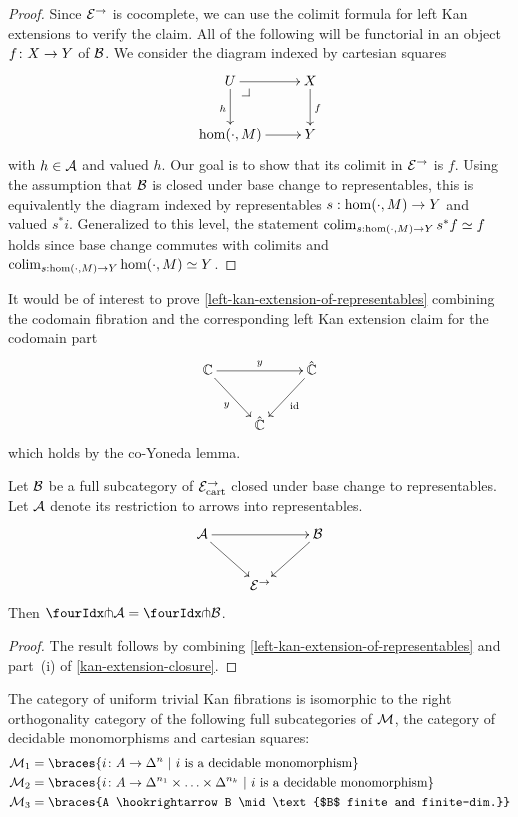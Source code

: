 \documentclass[reqno,10pt,a4paper,oneside]{amsart}
\begin{document}
\begin{proof}
Since $\catE^{\to}$ is cocomplete, we can use the colimit formula for left Kan extensions to verify the claim.
All of the following will be functorial in an object $f \co X \to Y$ of $\cal{B}$.
We consider the diagram indexed by cartesian squares
\[
\xymatrix{
  U
  \ar[r]
  \ar[d]_{h}
  \pullback{dr}
&
  X
  \ar[d]^{f}
\\
  \hom(\arghole, M)
  \ar[r]
&
  Y
}
\]
with $h \in \cal{A}$ and valued $h$.
Our goal is to show that its colimit in $\catE^{\to}$ is $f$.
Using the assumption that $\cal{B}$ is closed under base change to representables, this is equivalently the diagram indexed by representables $s : \hom(\arghole, M) \to Y$ and valued $s^* i$.
Generalized to this level, the statement $\colim_{s : \hom(\arghole, M) \to Y} s^* f \simeq f$ holds since base change commutes with colimits and 
$\colim_{s : \hom(\arghole, M) \to Y} \hom(\arghole, M) \simeq Y$.
\end{proof}


\begin{remark} It would be of interest to prove \cref{left-kan-extension-of-representables} combining 
the codomain fibration and the corresponding left Kan extension claim for the codomain part
\[
\xymatrix{
  \cat{C}
  \ar[rr]^{y}
  \ar[dr]_{y}
&&
  \hat{\catC}
  \ar[dl]^{\id}
\\&
  \hat{\cat{C}}
}
\]
which holds by the co-Yoneda lemma.
\end{remark}



\begin{lemma}
\label{awfs-on-arrows-into-representables}
Let $\cal{B}$ be a full subcategory of $\catE_{\cart}^{\to}$ closed under base change to representables.
Let $\cal{A}$ denote its restriction to arrows into representables.
\[
\xymatrix{
  \cal{A}
  \ar[rr]
  \ar[dr]
&&
  \cal{B}
  \ar[dl]
\\&
  \catE^{\to}
}
\]
Then $\liftr{\cal{A}} = \liftr{\cal{B}}$.
\end{lemma}

\begin{proof} The result follows by combining \cref{left-kan-extension-of-representables} and part~(i) of \cref{kan-extension-closure}. 
\end{proof}


\begin{theorem} \label{small-gen-triv-kan}
The category of uniform trivial Kan fibrations is isomorphic to the right orthogonality 
category of the following full subcategories of $\cal{M}$, the category of decidable
monomorphisms and cartesian squares:
\begin{align*}
\cal{M}_1 & = \braces{i \co A \rightarrow \Delta^{n} \ | \ i \text{ is a  decidable monomorphism} } \\ 
\cal{M}_2  & = \braces{i \co A \rightarrow \Delta^{n_1} \times \ldots \times \Delta^{n_k} 
\ | \ i \text{ is a  decidable monomorphism} }  \\
\cal{M}_3  & = \braces{A \hookrightarrow B \mid \text{$B$ finite and finite-dim.}} \\
\end{align*}
\end{theorem}
\end{document}
